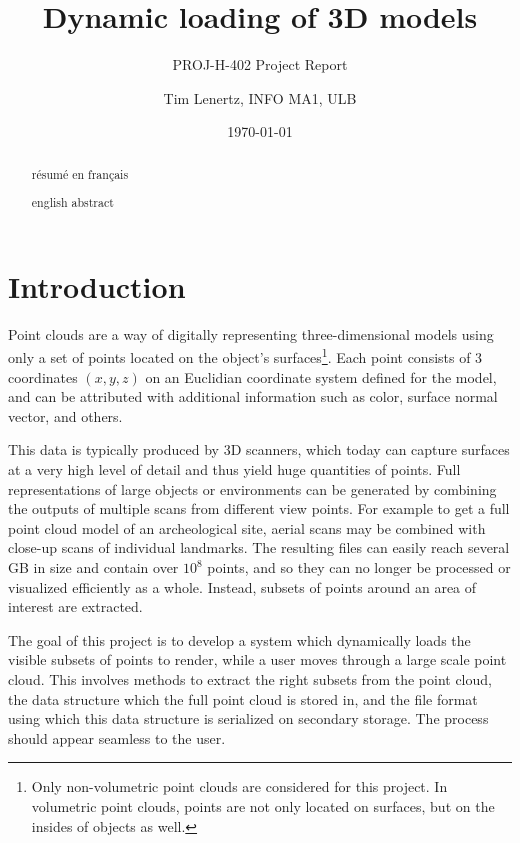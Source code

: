 \documentclass[a4paper,10pt,abstracton,notitlepage]{scrreprt}
\title{Dynamic loading of 3D models}
\subtitle{PROJ-H-402 Project Report}
\author{Tim Lenertz, INFO MA1, ULB}
\date{\today}
\begin{document}
\maketitle{}

\vspace{3cm}
\renewcommand{\abstractname}{Résumé}
\begin{abstract}
résumé en français
\end{abstract}

\vspace{2cm}
\renewcommand{\abstractname}{Abstract}
\begin{abstract}
english abstract
\end{abstract}

\tableofcontents{}

\chapter{Introduction}
Point clouds are a way of digitally representing three-dimensional models using only a set of points located on the object's surfaces\footnote{Only non-volumetric point clouds are considered for this project. In volumetric point clouds, points are not only located on surfaces, but on the insides of objects as well.}. Each point consists of 3 coordinates $(x, y, z)$ on an Euclidian coordinate system defined for the model, and can be attributed with additional information such as color, surface normal vector, and others.

This data is typically produced by 3D scanners, which today can capture surfaces at a very high level of detail and thus yield huge quantities of points. Full representations of large objects or environments can be generated by combining the outputs of multiple scans from different view points. For example to get a full point cloud model of an archeological site, aerial scans may be combined with close-up scans of individual landmarks. The resulting files can easily reach several GB in size and contain over $10^{8}$ points, and so they can no longer be processed or visualized efficiently as a whole. Instead, subsets of points around an area of interest are extracted.

The goal of this project is to develop a system which dynamically loads the visible subsets of points to render, while a user moves through a large scale point cloud. This involves methods to extract the right subsets from the point cloud, the data structure which the full point cloud is stored in, and the file format using which this data structure is serialized on secondary storage. The process should appear seamless to the user.
\end{document}
